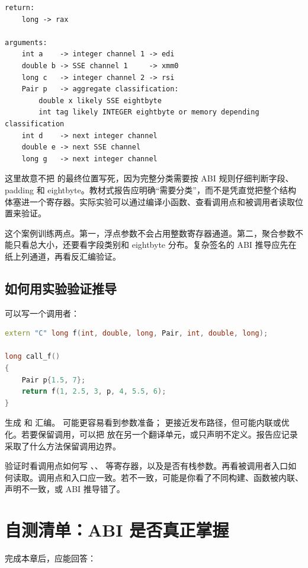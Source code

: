 \begin{lstlisting}
return:
    long -> rax

arguments:
    int a    -> integer channel 1 -> edi
    double b -> SSE channel 1     -> xmm0
    long c   -> integer channel 2 -> rsi
    Pair p   -> aggregate classification:
        double x likely SSE eightbyte
        int tag likely INTEGER eightbyte or memory depending classification
    int d    -> next integer channel
    double e -> next SSE channel
    long g   -> next integer channel
\end{lstlisting}

这里故意不把  的最终位置写死，因为完整分类需要按 ABI 规则仔细判断字段、padding 和 eightbyte。教材式报告应明确“需要分类”，而不是凭直觉把整个结构体塞进一个寄存器。实际实验可以通过编译小函数、查看调用点和被调用者读取位置来验证。

这个案例训练两点。第一，浮点参数不会占用整数寄存器通道。第二，聚合参数不能只看总大小，还要看字段类别和 eightbyte 分布。复杂签名的 ABI 推导应先在纸上列通道，再看反汇编验证。

\subsection{如何用实验验证推导}

可以写一个调用者：

\begin{lstlisting}[language=C++]
extern "C" long f(int, double, long, Pair, int, double, long);

long call_f()
{
    Pair p{1.5, 7};
    return f(1, 2.5, 3, p, 4, 5.5, 6);
}
\end{lstlisting}

生成  和  汇编。  可能更容易看到参数准备； 更接近发布路径，但可能内联或优化。若要保留调用，可以把  放在另一个翻译单元，或只声明不定义。报告应记录采取了什么方法保留调用边界。

验证时看调用点如何写 、、 等寄存器，以及是否有栈参数。再看被调用者入口如何读取。调用点和入口应一致。若不一致，可能是你看了不同构建、函数被内联、声明不一致，或 ABI 推导错了。

\section{自测清单：ABI 是否真正掌握}

完成本章后，应能回答：

